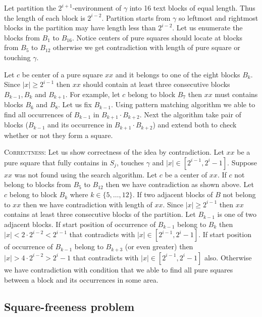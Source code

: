 ﻿\documentclass[11pt]{article}
\begin{document}
Let partition the $2^{i+1}$-environment of $\gamma$ into 16 text blocks of equal length. Thus the length of each
block is $2^{i-2}$. Partition starts from $\gamma$ so leftmost and rightmost blocks in the partition may have
length less than $2^{i-2}$. Let us enumerate the blocks from $B_1$ to $B_{16}$. Notice centers of pure squares
should locate at blocks from $B_5$ to $B_{12}$ otherwise we get contradiction with length of pure square or
touching $\gamma$.

Let $c$ be center of a pure square $xx$ and it belongs to one of the eight blocks $B_k$. Since $|x| \geq 2^{i-1}$
then $xx$ should contain at least three consecutive blocks $B_{k-1}, B_{k}$ and $B_{k+1}$. For example, let $c$
belong to block $B_7$ then $xx$ must contains blocks $B_6$ and $B_8$. Let us fix $B_{k-1}$. Using pattern matching
algorithm we able to find all occurrences of $B_{k-1}$ in $B_{k+1}\cdot B_{k+2}$. Next the algorithm take pair of
blocks ($B_{k-1}$ and its occurrence in $B_{k+1}\cdot B_{k+2}$) and extend both to check whether or not they form
a square.

\noindent \textsc{Correctness:} Let us show correctness of the idea by contradiction. Let $xx$ be a pure square that
fully contains in $S_j$, touches $\gamma$ and $|x| \in [2^{i-1}, 2^i-1]$. Suppose $xx$ was not found using the search
algorithm. Let $c$ be a center of $xx$. If $c$ not belong to blocks from $B_5$ to $B_{12}$ then we have contradiction
as shown above. Let $c$ belong to block $B_k$ where $k\in \{ 5, \dots, 12 \}$. If two adjacent blocks of $B$ not
belong to $xx$ then we have contradiction with length of $xx$. Since $|x| \geq 2^{i-1}$ then $xx$ contains at least
three consecutive blocks of the partition. Let $B_{k-1}$ is one of two adjacent blocks. If start position of occurrence
of $B_{k-1}$ belong to $B_k$ then $|x| < 2\cdot 2^{i-2} < 2^{i-1}$ that contradicts with $|x| \in [2^{i-1},2^i-1]$. If
start position of occurrence of $B_{k-1}$ belong to $B_{k+3}$ (or even greater) then $|x| > 4\cdot 2^{i-2} > 2^i-1$
that contradicts with $|x| \in [2^{i-1},2^i-1]$ also. Otherwise we have contradiction with condition that we able to
find all pure squares between a block and its occurrences in some area.

\subsection{Square-freeness problem}

\end{document}
